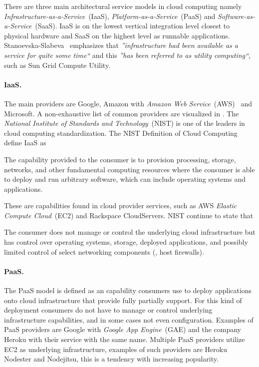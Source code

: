 There are three main architectural service models in cloud computing\cite{nist:mell11}
namely \emph{Infrastructure-as-a-Service}~(IaaS), \emph{Platform-as-a-Service}~(PaaS)
and \emph{Software-as-a-Service}~(SaaS).
IaaS is on the lowest vertical integration level closest to physical hardware and SaaS on the highest
level as runnable applications.
Stanoevska-Slabeva~\cite{introduction:wozniak10} emphasizes that
\emph{''infrastructure had been available as a service for quite some time``} and this 
\emph{''has been referred to as utility computing``}, such as Sun Grid Compute Utility.

\paragraph{IaaS.}
The main providers are Google, Amazon with \emph{Amazon Web Service}~(AWS)~\cite{aws} and Microsoft.
A non-exhaustive list of common providers are visualized in .
The \emph{National Institute of Standards and Technology}~(NIST) is one of 
the leaders in cloud computing standardization.
The NIST Definition of Cloud Computing~\cite{nist:mell11} define IaaS as
\epigraph{The capability provided to the consumer is to provision 
  processing, storage, networks, and other fundamental computing resources where the 
  consumer is able to deploy and run arbitrary software, which can include operating 
  systems and applications.
}{}
These are capabilities found in cloud provider services, 
such as AWS \emph{Elastic Compute Cloud}~(EC2) and Rackspace CloudServers.
NIST continue to state that 
\epigraph{The consumer does not manage or control the underlying cloud 
  infrastructure but has control over operating systems, storage, deployed applications, and 
  possibly limited control of select networking components (\eg, host firewalls).
}{}
\paragraph{PaaS.}
The PaaS model is defined as an capability consumers use to deploy applications onto cloud infrastructure
that provide fully partially support.
For this kind of deployment
consumers do not have to manage or control underlying infrastructure capabilities,
and in some cases not even configuration.
Examples of PaaS providers are Google with \emph{Google App Engine}~(GAE) and
the company Heroku with their service with the same name.
Multiple PaaS providers utilize EC2 as underlying infrastructure, examples of such
providers are Heroku Nodester and Nodejitsu, this is a tendency with increasing popularity.
